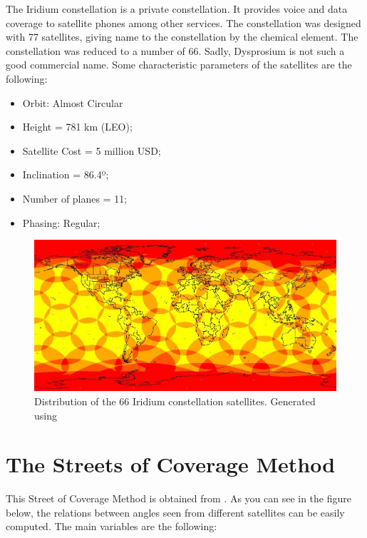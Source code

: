The Iridium constellation is a private constellation. It provides voice and data coverage to satellite phones among other services. The constellation was designed with 77 satellites, giving name to the constellation by the chemical element. The constellation was reduced to a number of 66. Sadly, Dysprosium is not such a good commercial name. Some characteristic parameters of the satellites are the following:

\begin{itemize}
\item Orbit: Almost Circular
\item Height = 781 km (LEO);
\item Satellite Cost = 5 million USD;
\item Inclination = 86.4º;
\item Number of planes = 11;
\item Phasing: Regular;
\end{itemize}

\begin{figure}[H]
\begin{center}
\includegraphics[scale=0.6]{PolarOrbits/Iridium.jpg}
\caption[Distribution of the 66 Iridium constellation satellites]{Distribution of the 66 Iridium constellation satellites. Generated using \cite{Wood2011}}
\end{center}
\end{figure} 
\newpage

\section{The Streets of Coverage Method}
\label{ch:streetscov}
This  Street of Coverage Method is obtained from 
\cite{Chobotov2002}. As you can see in the figure below,
 the relations between angles seen from different satellites can
 be easily computed. The main variables are the following:

